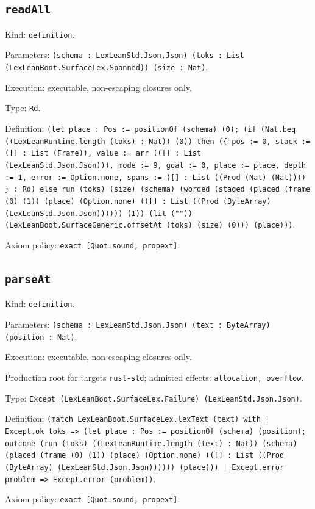 \documentclass[11pt]{article}
\begin{document}
\subsection*{\texttt{readAll}}
\noindent Kind: \texttt{definition}.\par
\noindent Parameters: \texttt{(schema : LexLeanStd.Json.Json) (toks : List (LexLeanBoot.SurfaceLex.Spanned)) (size : Nat)}.\par
\noindent Execution: executable, non-escaping closures only.\par
\noindent Type: \texttt{Rd}.\par
\noindent Definition: \texttt{(let place : Pos := positionOf (schema) (0); (if (Nat.beq ((LexLeanRuntime.length (toks) : Nat)) (0)) then (\{ pos := 0, stack := ([] : List (Frame)), value := arr (([] : List (LexLeanStd.Json.Json))), mode := 9, goal := 0, place := place, depth := 1, error := Option.none, spans := ([] : List ((Prod (Nat) (Nat)))) \} : Rd) else run (toks) (size) (schema) (worded (staged (placed (frame (0) (1)) (place) (Option.none) (([] : List ((Prod (ByteArray) (LexLeanStd.Json.Json)))))) (1)) (lit ("")) (LexLeanBoot.SurfaceGeneric.offsetAt (toks) (size) (0))) (place)))}.\par
\noindent Axiom policy: \texttt{exact [Quot.sound, propext]}.\par
\subsection*{\texttt{parseAt}}
\noindent Kind: \texttt{definition}.\par
\noindent Parameters: \texttt{(schema : LexLeanStd.Json.Json) (text : ByteArray) (position : Nat)}.\par
\noindent Execution: executable, non-escaping closures only.\par
\noindent Production root for targets \texttt{rust-std}; admitted effects: \texttt{allocation, overflow}.\par
\noindent Type: \texttt{Except (LexLeanBoot.SurfaceLex.Failure) (LexLeanStd.Json.Json)}.\par
\noindent Definition: \texttt{(match LexLeanBoot.SurfaceLex.lexText (text) with | Except.ok toks => (let place : Pos := positionOf (schema) (position); outcome (run (toks) ((LexLeanRuntime.length (text) : Nat)) (schema) (placed (frame (0) (1)) (place) (Option.none) (([] : List ((Prod (ByteArray) (LexLeanStd.Json.Json)))))) (place))) | Except.error problem => Except.error (problem))}.\par
\noindent Axiom policy: \texttt{exact [Quot.sound, propext]}.\par
\end{document}
